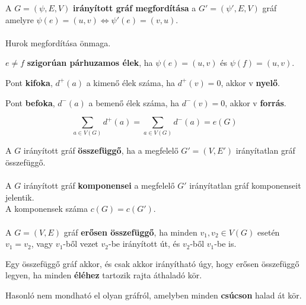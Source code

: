 \documentclass{beamer}
\begin{document}
\begin{frame}
\begin{tcolorbox}[squeezed title={Def.: Irányított gráf megfordítása}]
A $G = ({\psi}, E, V)$ \textbf{irányított gráf megfordítása} a $G' = ({\psi}', E, V)$ gráf amelyre ${\psi}(e) = (u, v) \iff {\psi}'(e) = (v, u)$.\\
\\
Hurok megfordítása önmaga.
\end{tcolorbox}

\begin{tcolorbox}[title={Def.: Sigorúan Párhuzamos Élek}]
$e \neq f$ \textbf{szigorúan párhuzamos élek}, ha ${\psi}(e) = (u, v)$ és ${\psi}(f) = (u, v)$.
\end{tcolorbox}

\begin{tcolorbox}[title={Def.: Kifok, Nyelő}]
Pont \textbf{kifoka}, $d^+(a)$ a kimenő élek száma, ha $d^+(v) = 0$, akkor v \textbf{nyelő}.
\end{tcolorbox}

\begin{tcolorbox}[title={Def.: Befok, Forrás}]
Pont \textbf{befoka}, $d^-(a)$ a bemenő élek száma, ha $d^-(v) = 0$, akkor v \textbf{forrás}.
\end{tcolorbox}

\begin{tcolorbox}[title={Ész}]
$$\sum_{a \in V(G)} d^+(a) = \sum_{a \in V(G)} d^-(a) = e(G)$$
\end{tcolorbox}
\end{frame}


\begin{frame}
\begin{tcolorbox}[ title={Def.: Összefüggőség (Irányított gráf)}]
A $G$ irányított gráf \textbf{összefüggő}, ha a megfelelő $G' = (V, E')$ irányítatlan gráf összefüggő.\\
\\
A $G$ irányított gráf \textbf{komponensei} a megfelelő $G'$ irányítatlan gráf komponenseit jelentik.\\
A komponensek száma $c(G) = c(G')$.\\
\\
A $G = (V, E)$ gráf \textbf{erősen összefüggő}, ha minden $v_1, v_2 \in V(G)$ esetén $v_1 = v_2$, vagy $v_1$-ből vezet $v_2$-be irányított út, és $v_2$-ből $v_1$-be is.
\end{tcolorbox}

\begin{tcolorbox}[title={Tétel: Erős összefüggőség}]
Egy összefüggő gráf akkor, és csak akkor irányítható úgy, hogy erősen összefüggő legyen, ha minden \textbf{éléhez} tartozik rajta áthaladó kör.
\end{tcolorbox}

\begin{tcolorbox}[title={Ész}]
Hasonló nem mondható el olyan gráfról, amelyben minden \textbf{csúcson} halad át kör.
\end{tcolorbox}
\end{frame}
\end{document}
